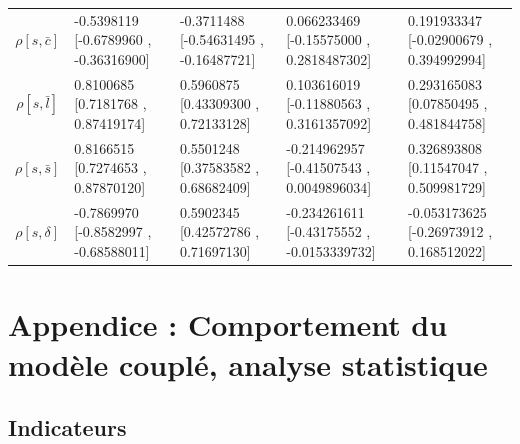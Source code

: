 \begin{center}
\begin{tabular}{|c|p{3.7cm}|p{3.7cm}|p{3.7cm}|p{3.7cm}|}
$\rho[s,\bar{c}]$&-0.5398119 [-0.6789960 , -0.36316900]&-0.3711488 [-0.54631495 , -0.16487721]&0.066233469 [-0.15575000 , 0.2818487302]&0.191933347 [-0.02900679 , 0.394992994]\\
$\rho[s,\bar{l}]$&0.8100685 [0.7181768 , 0.87419174]&0.5960875 [0.43309300 , 0.72133128]&0.103616019 [-0.11880563 , 0.3161357092]&0.293165083 [0.07850495 , 0.481844758]\\
$\rho[s,\bar{s}]$&0.8166515 [0.7274653 , 0.87870120]&0.5501248 [0.37583582 , 0.68682409]&-0.214962957 [-0.41507543 , 0.0049896034]&0.326893808 [0.11547047 , 0.509981729]\\
$\rho[s,\delta]$&-0.7869970 [-0.8582997 , -0.68588011]&0.5902345 [0.42572786 , 0.71697130]&-0.234261611 [-0.43175552 , -0.0153339732]&-0.053173625 [-0.26973912 , 0.168512022]\\
\end{tabular}


\end{center}







\section*{Appendice : Comportement du modèle couplé, analyse statistique}


\subsection*{Indicateurs}

